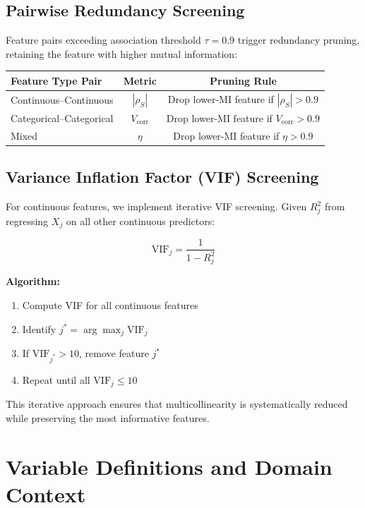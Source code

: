 \subsection{Pairwise Redundancy Screening}

Feature pairs exceeding association threshold $\tau = 0.9$ trigger redundancy pruning, retaining the feature with higher mutual information:

\begin{center}
\begin{tabular}{|l|c|c|}
\hline
\textbf{Feature Type Pair} & \textbf{Metric} & \textbf{Pruning Rule} \\
\hline
Continuous--Continuous & $|\rho_S|$ & Drop lower-MI feature if $|\rho_S| > 0.9$ \\
\hline
Categorical--Categorical & $V_{\text{corr}}$ & Drop lower-MI feature if $V_{\text{corr}} > 0.9$ \\
\hline
Mixed & $\eta$ & Drop lower-MI feature if $\eta > 0.9$ \\
\hline
\end{tabular}
\end{center}

\subsection{Variance Inflation Factor (VIF) Screening}

For continuous features, we implement iterative VIF screening. Given $R^2_j$ from regressing $X_j$ on all other continuous predictors:

\begin{equation}
\text{VIF}_j = \frac{1}{1 - R^2_j}
\label{eq:vif}
\end{equation}

\textbf{Algorithm:}
\begin{enumerate}
    \item Compute VIF for all continuous features
    \item Identify $j^* = \arg\max_j \text{VIF}_j$
    \item If $\text{VIF}_{j^*} > 10$, remove feature $j^*$
    \item Repeat until all $\text{VIF}_j \leq 10$
\end{enumerate}

This iterative approach ensures that multicollinearity is systematically reduced while preserving the most informative features.

\section{Variable Definitions and Domain Context}


